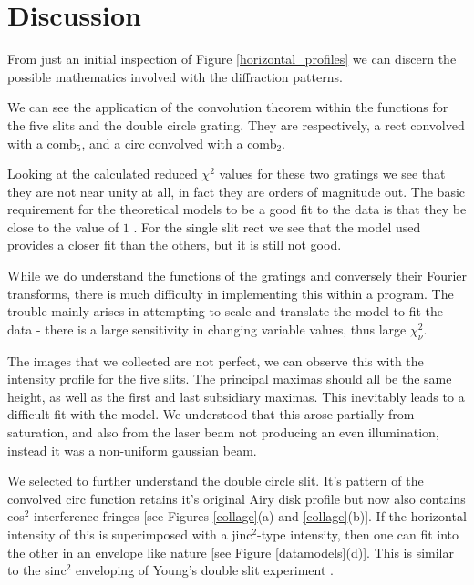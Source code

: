 \documentclass[twocolumn]{revtex4}
\begin{document}
\vspace{-3ex}
\section{Discussion}
\vspace{-2ex}
From just an initial inspection of Figure \ref{horizontal_profiles} we can discern the possible mathematics involved with the diffraction patterns.

We can see the application of the convolution theorem within the functions for the five slits and the double circle grating. They are respectively, a rect convolved with a comb$_5$, and a circ convolved with a comb$_2$. 

Looking at the calculated reduced $\chi^2$ values for these two gratings we see that they are not near unity at all, in fact they are orders of magnitude out. The basic requirement for the theoretical models to be a good fit to the data  is that they be close to the value of $1$ \cite{hughesandhayes}. For the single slit rect we see that the model used provides a closer fit than the others, but it is still not good.

While we do understand the functions of the gratings and conversely their Fourier transforms, there is much difficulty in implementing this within a program. The trouble mainly arises in attempting to scale and translate the model to fit the data - there is a large sensitivity in changing variable values, thus large $\chi^2_{\nu}$.

The images that we collected are not perfect, we can observe this with the intensity profile for the five slits. The principal maximas should all be the same height, as well as the first and last subsidiary maximas. This inevitably leads to a difficult fit with the model. We understood that this arose partially from saturation, and also from the laser beam not producing an even illumination, instead it was a non-uniform gaussian beam.

We selected to further understand the double circle slit. It's pattern of the convolved circ function retains it's original Airy disk profile but now also contains cos$^2$ interference fringes [see Figures \ref{collage}(a) and \ref{collage}(b)]. If the horizontal intensity of this is superimposed with a jinc$^2$-type intensity, then one can fit into the other in an envelope like nature [see Figure \ref{datamodels}(d)]. This is similar to the sinc$^2$ enveloping of Young's double slit experiment \cite{of2f}.
\end{document}
